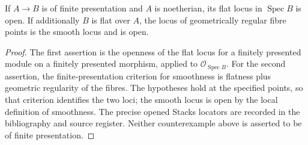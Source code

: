 \begin{proposition}\label{SA23-A-13}
If $A\to B$ is of finite presentation and $A$ is noetherian, its
flat locus in $\operatorname{Spec}B$ is open.  If additionally
$B$ is flat over $A$, the locus of geometrically regular fibre
points is the smooth locus and is open.
\end{proposition}
\begin{proof}
The first assertion is the openness of the flat locus for a
finitely presented module on a finitely presented morphism,
applied to $\mathcal O_{\operatorname{Spec}B}$.
For the second assertion, the finite-presentation criterion for
smoothness is flatness plus geometric regularity of the fibres.
The hypotheses hold at the specified points, so that criterion
identifies the two loci; the smooth locus is open by the local
definition of smoothness.  The precise opened Stacks locators are
recorded in the bibliography and source register.  Neither
counterexample above is asserted to be of finite presentation.
\end{proof}
